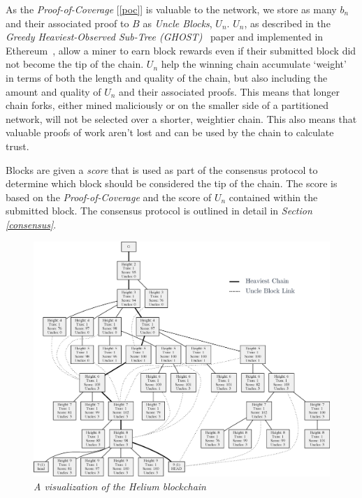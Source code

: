 \documentclass[letterpaper,11pt]{article}
\begin{document}
As the \emph{Proof-of-Coverage} [\ref{poc}] is valuable to the network, we store as many $b_n$ and their associated proof to $B$ as \emph{Uncle Blocks}, $U_n$. $U_n$, as described in the \emph{Greedy Heaviest-Observed Sub-Tree (GHOST)}~\cite{ghost} paper and implemented in Ethereum~\cite{ethereum}, allow a miner to earn block rewards even if their submitted block did not become the tip of the chain. $U_n$ help the winning chain accumulate `weight' in terms of both the length and quality of the chain, but also including the amount and quality of $U_n$ and their associated proofs. This means that longer chain forks, either mined maliciously or on the smaller side of a partitioned network, will not be selected over a shorter, weightier chain. This also means that valuable proofs of work aren't lost and can be used by the chain to calculate trust.

Blocks are given a \emph{score} that is used as part of the consensus protocol to determine which block should be considered the tip of the chain. The score is based on the \emph{Proof-of-Coverage} and the score of $U_n$ contained within the submitted block. The consensus protocol is outlined in detail in \emph{Section \ref{consensus}}.

\begin{figure}[H]
    \begin{center}
          \includegraphics[width=\textwidth]{chain.eps}
          \caption{\emph{A visualization of the Helium blockchain}}
          \label{fig:chain}
     \end{center}
\end{figure}
\end{document}
